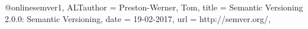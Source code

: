 @online{semver1,
	ALTauthor = {Preston-Werner, Tom},
	title = {Semantic Versioning 2.0.0: Semantic Versioning},
	date = {19-02-2017},
	url = {http://semver.org/},
}
